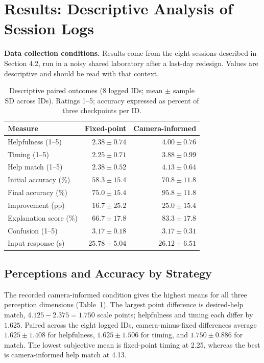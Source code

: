 \documentclass[conference]{IEEEtran}
\begin{document}
\section{Results: Descriptive Analysis of Session Logs}
\textbf{Data collection conditions.} Results come from the eight sessions described in Section 4.2, run in a noisy shared laboratory after a last-day redesign. Values are descriptive and should be read with that context.
\begin{table}[t]
\caption{Descriptive paired outcomes (8 logged IDs; mean $\pm$ sample SD across IDs). Ratings 1--5; accuracy expressed as percent of three checkpoints per ID.}
\label{tab:primary}
\centering\footnotesize
\begin{tabular}{lrr}
\toprule
Measure & Fixed-point & Camera-informed\\
\midrule
Helpfulness (1--5) & $2.38\pm0.74$ & $4.00\pm0.76$\\
Timing (1--5) & $2.25\pm0.71$ & $3.88\pm0.99$\\
Help match (1--5) & $2.38\pm0.52$ & $4.13\pm0.64$\\
Initial accuracy (\%) & $58.3\pm15.4$ & $70.8\pm11.8$\\
Final accuracy (\%) & $75.0\pm15.4$ & $95.8\pm11.8$\\
Improvement (pp) & $16.7\pm25.2$ & $25.0\pm15.4$\\
Explanation score (\%) & $66.7\pm17.8$ & $83.3\pm17.8$\\
Confusion (1--5) & $3.17\pm0.18$ & $3.17\pm0.31$\\
Input response (s) & $25.78\pm5.04$ & $26.12\pm6.51$\\
\bottomrule
\end{tabular}
\end{table}

\subsection{Perceptions and Accuracy by Strategy}
The recorded camera-informed condition gives the highest means for all three perception dimensions (Table~\ref{tab:primary}). The largest point difference is desired-help match, $4.125-2.375=1.750$ scale points; helpfulness and timing each differ by $1.625$. Paired across the eight logged IDs, camera-minus-fixed differences average $1.625\pm1.408$ for helpfulness, $1.625\pm1.506$ for timing, and $1.750\pm0.886$ for match. The lowest subjective mean is fixed-point timing at 2.25, whereas the best is camera-informed help match at 4.13.
\end{document}
